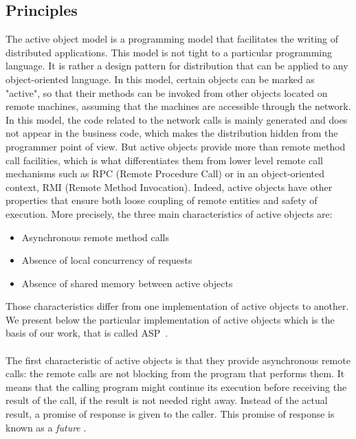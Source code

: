 \documentclass[11pt]{report}
\begin{document}
\subsection{Principles}\label{sec:activeobjects}
The active object model is a programming model that facilitates the writing of distributed applications. This model is not tight to a particular programming language. It is rather a design pattern for distribution that can be applied to any object-oriented language. In this model, certain objects can be marked as "active", so that their methods can be invoked from other objects located on remote machines, assuming that the machines are accessible through the network. In this model, the code related to the network calls is mainly generated and does not appear in the business code, which makes the distribution hidden from the programmer point of view. But active objects provide more than remote method call facilities, which is what differentiates them from lower level remote call mechanisms such as RPC (Remote Procedure Call)\cite{ref:rpc} or in an object-oriented context, RMI (Remote Method Invocation)\cite{ref:rmi}. Indeed, active objects have other properties that ensure both loose coupling of remote entities and safety of execution. More precisely, the three main characteristics of active objects are:
\begin{itemize}
\item Asynchronous remote method calls
\item Absence of local concurrency of requests
\item Absence of shared memory between active objects
\end{itemize}

Those characteristics differ from one implementation of active objects to another. We present below the particular implementation of active objects which is the basis of our work, that is called ASP~\cite{ref:asp}.

\paragraph{}
The first characteristic of active objects is that they provide asynchronous remote calls: the remote calls are not blocking from the program that performs them. It means that the calling program might continue its execution before receiving the result of the call, if the result is not needed right away. Instead of the actual result, a promise of response is given to the caller. This promise of response is known as a \emph{future} \cite{ref:Halstead:1985:MLC:4472.4478}. 
\end{document}
